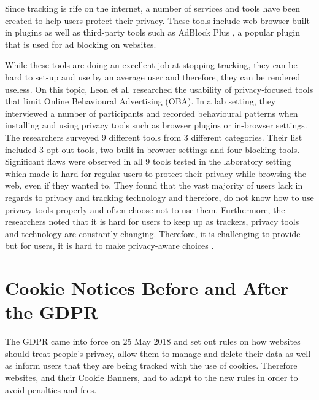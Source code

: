 \documentclass[../main.tex]{subfiles}
\begin{document}
Since tracking is rife on the internet, a number of services and tools have been created to help users protect their privacy. These tools include web browser built-in plugins as well as third-party tools such as AdBlock Plus \cite{adp}, a popular plugin that is used for ad blocking on websites. 

While these tools are doing an excellent job at stopping tracking, they can be hard to set-up and use by an average user and therefore, they can be rendered useless. On this topic, Leon et al. \cite{leon2012johnny} researched the usability of privacy-focused tools that limit Online Behavioural Advertising (OBA). In a lab setting, they interviewed a number of participants and recorded behavioural patterns when installing and using privacy tools such as browser plugins or in-browser settings. The researchers surveyed 9 different tools from 3 different categories. Their list included 3 opt-out tools, two built-in browser settings and four blocking tools. Significant flaws were observed in all 9 tools tested in the laboratory setting which made it hard for regular users to protect their privacy while browsing the web, even if they wanted to. They found that the vast majority of users lack  in regards to privacy and tracking technology and therefore, do not know how to use privacy tools properly and often choose not to use them. Furthermore, the researchers noted that it is hard for users to keep up as trackers, privacy tools and technology are constantly changing. Therefore, it is challenging to provide  but for users, it is hard to make privacy-aware choices .

\section{Cookie Notices Before and After the GDPR}
The GDPR came into force on 25 May 2018 and set out rules on how websites should treat people's privacy, allow them to manage and delete their data as well as inform users that they are being tracked with the use of cookies. Therefore websites, and their Cookie Banners, had to adapt to the new rules in order to avoid penalties and fees. 
\end{document}
